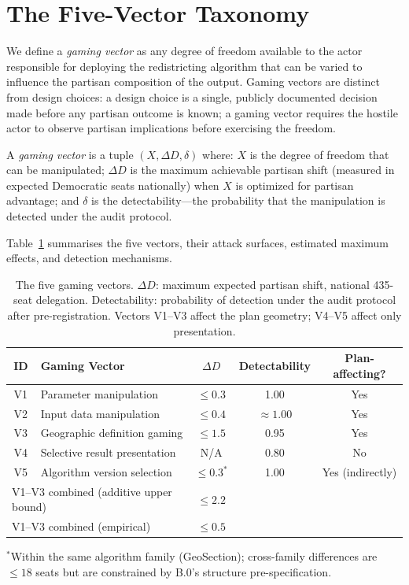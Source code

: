 \section{The Five-Vector Taxonomy}
\label{sec:taxonomy}

We define a \emph{gaming vector} as any degree of freedom available to
the actor responsible for deploying the redistricting algorithm that can
be varied to influence the partisan composition of the output.
Gaming vectors are distinct from design choices: a design choice is a
single, publicly documented decision made before any partisan outcome is
known; a gaming vector requires the hostile actor to observe partisan
implications before exercising the freedom.

\begin{definition}
A \emph{gaming vector} is a tuple $(X, \Delta D, \delta)$ where:
$X$ is the degree of freedom that can be manipulated;
$\Delta D$ is the maximum achievable partisan shift (measured in expected
Democratic seats nationally) when $X$ is optimized for partisan advantage;
and $\delta$ is the detectability---the probability that the manipulation
is detected under the \dia{} audit protocol.
\end{definition}

Table~\ref{tab:taxonomy} summarises the five vectors, their attack surfaces,
estimated maximum effects, and detection mechanisms.

\begin{table}[h]
\centering
\caption{The five gaming vectors. $\Delta D$: maximum expected partisan
         shift, national 435-seat delegation. Detectability: probability of
         detection under the \dia{} audit protocol after pre-registration.
         Vectors V1--V3 affect the plan geometry; V4--V5 affect only presentation.}
\label{tab:taxonomy}
\begin{tabular}{clccc}
\toprule
ID & Gaming Vector & $\Delta D$ & Detectability & Plan-affecting? \\
\midrule
V1 & Parameter manipulation & $\leq 0.3$ & 1.00 & Yes \\
V2 & Input data manipulation & $\leq 0.4$ & $\approx 1.00$ & Yes \\
V3 & Geographic definition gaming & $\leq 1.5$ & 0.95 & Yes \\
V4 & Selective result presentation & N/A & 0.80 & No \\
V5 & Algorithm version selection & $\leq 0.3^*$ & 1.00 & Yes (indirectly) \\
\midrule
\multicolumn{2}{l}{V1--V3 combined (additive upper bound)} & $\leq 2.2$ & & \\
\multicolumn{2}{l}{V1--V3 combined (empirical)} & $\leq 0.5$ & & \\
\bottomrule
\end{tabular}
\begin{flushleft}
\small $^*$Within the same algorithm family (GeoSection); cross-family
differences are $\leq 18$ seats but are constrained by B.0's structure pre-specification.
\end{flushleft}
\end{table}

